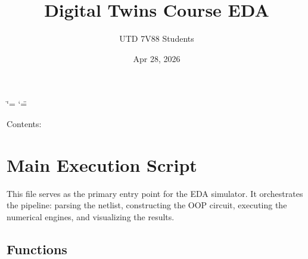 \documentclass[letterpaper,10pt,english]{sphinxmanual}
\title{Digital Twins Course EDA}
\date{Apr 28, 2026}
\author{UTD 7V88 Students}
\begin{document}
\ifdefined\shorthandoff
  \ifnum\catcode`\=\string=\active\shorthandoff{=}\fi
  \ifnum\catcode`\"=\active{}\fi
\fi

\pagestyle{empty}
\sphinxmaketitle
\pagestyle{plain}
\sphinxtableofcontents
\pagestyle{normal}
\label{\detokenize{index::doc}}


\sphinxAtStartPar
Contents:

\sphinxstepscope


\chapter{Main Execution Script}
\label{\detokenize{simulation_core:main-execution-script}}\label{\detokenize{simulation_core::doc}}
\sphinxAtStartPar
This file serves as the primary entry point for the EDA simulator. It orchestrates
the pipeline: parsing the netlist, constructing the OOP circuit, executing the
numerical engines, and visualizing the results.


\section{Functions}
\label{\detokenize{simulation_core:functions}}
\end{document}
